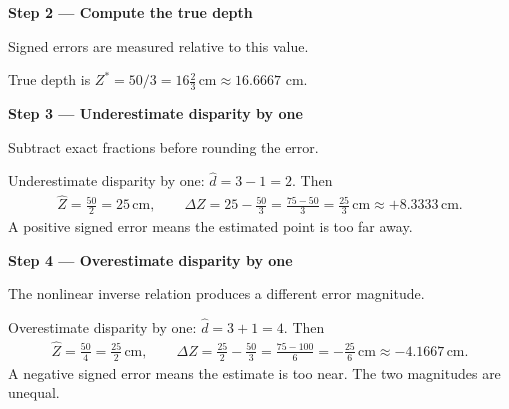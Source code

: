\documentclass[letterpaper,11pt,english,openany,oneside]{jupyterBook}
\begin{document}
\par

\par\medskip{}
{\color{QuizStepRed}\bfseries Step 2 — Compute the true depth}\par\smallskip

\sphinxAtStartPar
{} Signed errors are measured relative to this value.

\sphinxAtStartPar
True depth is {\color{QuizMathBlue} \(Z^*=50/3=\boxed{16\tfrac23\,\mathrm{cm}}\approx16.6667\)} cm.

\par

\par\medskip{}
{\color{QuizStepRed}\bfseries Step 3 — Underestimate disparity by one}\par\smallskip

\sphinxAtStartPar
{} Subtract exact fractions before rounding the error.

\sphinxAtStartPar
Underestimate disparity by one: {\color{QuizMathBlue} \(\widehat d=3-1=2\)}. Then
{\color{QuizMathBlue} \begin{equation*}
\begin{split}
\widehat Z=\frac{50}{2}=25\,\mathrm{cm},\qquad
\Delta Z=25-\frac{50}{3}=\frac{75-50}{3}=\frac{25}{3}\,\mathrm{cm}\approx+8.3333\,\mathrm{cm}.
\end{split}
\end{equation*}}
\sphinxAtStartPar
A positive signed error means the estimated point is too far away.

\par

\par\medskip{}
{\color{QuizStepRed}\bfseries Step 4 — Overestimate disparity by one}\par\smallskip

\sphinxAtStartPar
{} The nonlinear inverse relation produces a different error magnitude.

\sphinxAtStartPar
Overestimate disparity by one: {\color{QuizMathBlue} \(\widehat d=3+1=4\)}. Then
{\color{QuizMathBlue} \begin{equation*}
\begin{split}
\widehat Z=\frac{50}{4}=\frac{25}{2}\,\mathrm{cm},\qquad
\Delta Z=\frac{25}{2}-\frac{50}{3}=\frac{75-100}{6}=-\frac{25}{6}\,\mathrm{cm}\approx-4.1667\,\mathrm{cm}.
\end{split}
\end{equation*}}
\sphinxAtStartPar
A negative signed error means the estimate is too near. The two magnitudes are unequal.
\end{document}

